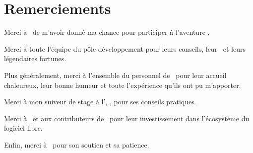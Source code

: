 \section*{Remerciements}

Merci à \ahugon\ de m'avoir donné ma chance pour participer à l'aventure \asl.

Merci à toute l'équipe du pôle développement pour leurs conseils, leur \acoaching\ et leurs légendaires fortunes.

Plus généralement, merci à l'ensemble du personnel de \asensio\ pour leur accueil chaleureux, leur bonne humeur et toute l'expérience qu'ils ont pu m'apporter.

Merci à mon suiveur de stage à l'\autc, \asuiveur, pour ses conseils pratiques.

Merci à \apotencier\ et aux contributeurs de \asf\ pour leur investissement dans l'écosystème du logiciel libre.

Enfin, merci à \asarah\ pour son soutien et sa patience.

